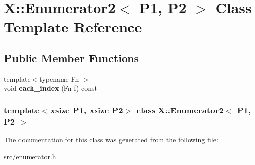\hypertarget{class_x_1_1_enumerator2}{\section{X\-:\-:Enumerator2$<$ P1, P2 $>$ Class Template Reference}
\label{class_x_1_1_enumerator2}
}
\subsection*{Public Member Functions}
\begin{DoxyCompactItemize}
\item 
\hypertarget{class_x_1_1_enumerator2_a5d834fbc808b8429dfe749133a856f2c}{{\footnotesize template$<$typename Fn $>$ }\\void {\bfseries each\-\_\-index} (Fn f) const }\label{class_x_1_1_enumerator2_a5d834fbc808b8429dfe749133a856f2c}

\end{DoxyCompactItemize}
\subsubsection*{template$<$xsize P1, xsize P2$>$ class X\-::\-Enumerator2$<$ P1, P2 $>$}



The documentation for this class was generated from the following file\-:\begin{DoxyCompactItemize}
\item 
src/enumerator.\-h\end{DoxyCompactItemize}
